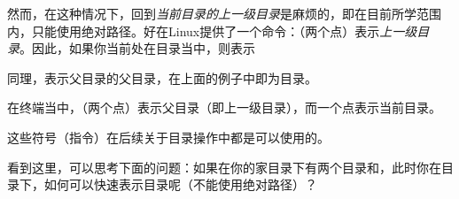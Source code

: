 然而，在这种情况下，回到\emph{当前目录的上一级目录}是麻烦的，即在目前所学范围内，只能使用绝对路径。好在Linux提供了一个命令：（两个点）表示\emph{上一级目录}。因此，如果你当前处在目录当中，则表示

同理，表示父目录的父目录，在上面的例子中即为目录。

\begin{attention}
    在终端当中，（两个点）表示父目录（即上一级目录），而一个点表示当前目录。

    这些符号（指令）在后续关于目录操作中都是可以使用的。
\end{attention}

看到这里，可以思考下面的问题：如果在你的家目录下有两个目录和，此时你在目录下，如何可以快速表示目录呢（不能使用绝对路径）？

